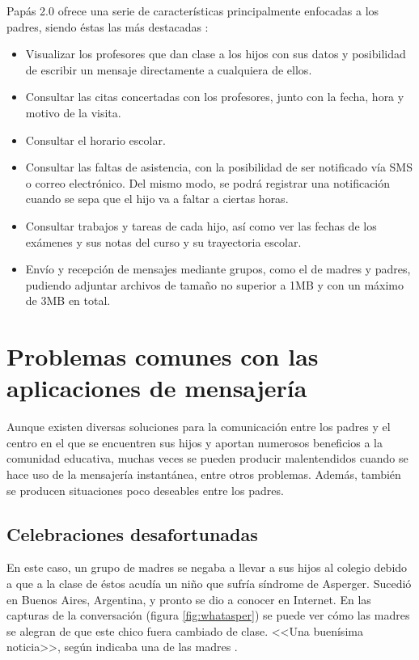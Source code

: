 \newpage

Papás 2.0 ofrece una serie de características principalmente enfocadas a los padres, siendo éstas las más destacadas \cite{JCCM2010}:

\begin{itemize}
	\item Visualizar los profesores que dan clase a los hijos con sus datos y posibilidad de escribir un mensaje directamente a cualquiera de ellos.
	\item Consultar las citas concertadas con los profesores, junto con la fecha, hora y motivo de la visita.
	\item Consultar el horario escolar.
	\item Consultar las faltas de asistencia, con la posibilidad de ser notificado vía SMS o correo electrónico. Del mismo modo, se podrá registrar una notificación cuando se sepa que el hijo va a faltar a ciertas horas.
	\item Consultar trabajos y tareas de cada hijo, así como ver las fechas de los exámenes y sus notas del curso y su trayectoria escolar.
	\item Envío y recepción de mensajes mediante grupos, como el de madres y padres, pudiendo adjuntar archivos de tamaño no superior a 1\acs{MB} y con un máximo de 3\acs{MB} en total.
\end{itemize}

\section*{Problemas comunes con las aplicaciones de mensajería}
Aunque existen diversas soluciones para la comunicación entre los padres y el centro en el que se encuentren sus hijos y aportan numerosos beneficios a la comunidad educativa, muchas veces se pueden producir malentendidos cuando se hace uso de la mensajería instantánea, entre otros problemas. Además, también se producen situaciones poco deseables entre los padres.

\newpage

\subsection*{Celebraciones desafortunadas}
En este caso, un grupo de madres se negaba a llevar a sus hijos al colegio debido a que a la clase de éstos acudía un niño que sufría síndrome de Asperger. Sucedió en Buenos Aires, Argentina, y pronto se dio a conocer en Internet.
En las capturas de la conversación (figura \ref{fig:whatasper}) se puede ver cómo las madres se alegran de que este chico fuera cambiado de clase. <<Una buenísima noticia>>, según indicaba una de las madres \cite{Vanguardia2017}.


